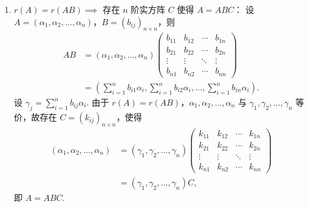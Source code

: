 \documentclass[12pt,fontset=fandol]{ctexart}
\begin{document}
\begin{solve}
\begin{enumerate}
                \item $r(A) = r(AB) \implies$ 存在 $n$ 阶实方阵 $C$ 使得 $A = ABC$：
                    设 $A = (\alpha_1, \alpha_2, \ldots, \alpha_n)$，$B = (b_{ij})_{n \times n}$，则
                    \begin{align*}
                        AB &= (\alpha_1, \alpha_2, \ldots, \alpha_n) \begin{pmatrix}
                                  b_{11} & b_{12} & \cdots & b_{1n} \\
                                  b_{21} & b_{22} & \cdots & b_{2n} \\
                                  \vdots & \vdots & \ddots & \vdots \\
                                  b_{n1} & b_{n2} & \cdots & b_{nn}
                              \end{pmatrix} \\
                           &= \left( \sum\limits_{i=1}^n b_{i1} \alpha_i, \sum\limits_{i=1}^n b_{i2} \alpha_i, \ldots, \sum\limits_{i=1}^n b_{in} \alpha_i \right).
                    \end{align*}
                    设 $\gamma_j = \sum\limits_{i=1}^n b_{ij} \alpha_i$. 由于 $r(A) = r(AB)$，$\alpha_1, \alpha_2, \ldots, \alpha_n$ 与 $\gamma_1, \gamma_2, \ldots, \gamma_n$ 等价，故存在 $C = (k_{ij})_{n \times n}$，使得
                    \begin{align*}
                        (\alpha_1, \alpha_2, \ldots, \alpha_n)
                        &= (\gamma_1, \gamma_2, \ldots, \gamma_n) \begin{pmatrix}
                            k_{11} & k_{12} & \cdots & k_{1n} \\
                            k_{21} & k_{22} & \cdots & k_{2n} \\
                            \vdots & \vdots & \ddots & \vdots \\
                            k_{n1} & k_{n2} & \cdots & k_{nn}
                        \end{pmatrix} \\
                        &= (\gamma_1, \gamma_2, \ldots, \gamma_n) C,
                    \end{align*}
                    即 $A = ABC$.
            \end{enumerate}
\end{solve}
\end{document}
